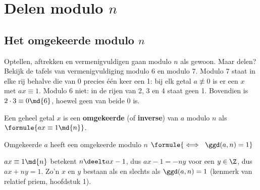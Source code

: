 \begin{oefeningen}
\end{oefeningen}

\section{Delen modulo \texorpdfstring{$n$}{n}}

\subsection{Het omgekeerde modulo \texorpdfstring{$n$}{n}}

Optellen, aftrekken en vermenigvuldigen gaan modulo $n$ als gewoon. Maar delen? Bekijk de tafels van vermenigvuldiging modulo 6 en modulo 7. Modulo 7 staat in elke rij behalve die van 0 precies één keer een 1: bij elk getal $a \not\equiv 0$ is er een $x$ met $ax \equiv 1$. Modulo 6 niet: in de rijen van 2, 3 en 4 staat geen 1. Bovendien is $2 \cdot 3 \equiv 0 \md{6}$, hoewel geen van beide 0 is.


\begin{theorie}
Een geheel getal $x$ is een \textbf{\textcolor{accent}{omgekeerde}} (of \textbf{\textcolor{accent}{inverse}}) van $a$ modulo $n$ als $\formule{ax \equiv 1 \md{n}}$.

\begin{stelling}{Omgekeerde}
\qquad $a$ heeft een omgekeerde modulo $n$ \quad $\formule{\iff \ \ggd(a, n) = 1}$
\end{stelling}

\begin{bewijs}
$ax \equiv 1 \md{n}$ betekent $n \deelt ax - 1$, dus $ax - 1 = -ny$ voor een $y \in \Z$, dus $ax + ny = 1$. Zo'n $x$ en $y$ bestaan als en slechts als $\ggd(a, n) = 1$ (kenmerk van relatief priem, hoofdstuk 1).
\end{bewijs}
\end{theorie}

